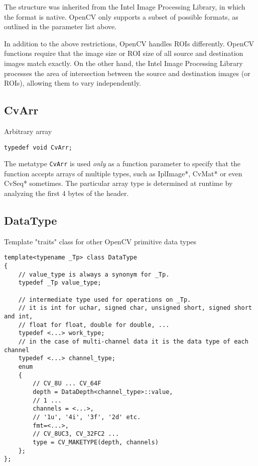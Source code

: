 The  structure was inherited from the Intel Image Processing Library, in which the format is native. OpenCV only supports a subset of possible  formats, as outlined in the parameter list above.

In addition to the above restrictions, OpenCV handles ROIs differently. OpenCV functions require that the image size or ROI size of all source and destination images match exactly. On the other hand, the Intel Image Processing Library processes the area of intersection between the source and destination images (or ROIs), allowing them to vary independently. 

\subsection{CvArr}\label{CvArr}
Arbitrary array

\begin{lstlisting}
typedef void CvArr;
\end{lstlisting}

The metatype \texttt{CvArr} is used \textit{only} as a function parameter to specify that the function accepts arrays of multiple types, such as IplImage*, CvMat* or even CvSeq* sometimes. The particular array type is determined at runtime by analyzing the first 4 bytes of the header.
\fi


\ifCpp
\subsection{DataType}\label{DataType}
Template "traits" class for other OpenCV primitive data types

\begin{lstlisting}
template<typename _Tp> class DataType
{
    // value_type is always a synonym for _Tp.
    typedef _Tp value_type;
    
    // intermediate type used for operations on _Tp.
    // it is int for uchar, signed char, unsigned short, signed short and int,
    // float for float, double for double, ...
    typedef <...> work_type;
    // in the case of multi-channel data it is the data type of each channel
    typedef <...> channel_type;
    enum
    {
        // CV_8U ... CV_64F
        depth = DataDepth<channel_type>::value,
        // 1 ... 
        channels = <...>,
        // '1u', '4i', '3f', '2d' etc.
        fmt=<...>,
        // CV_8UC3, CV_32FC2 ...
        type = CV_MAKETYPE(depth, channels)
    };
};
\end{lstlisting}

